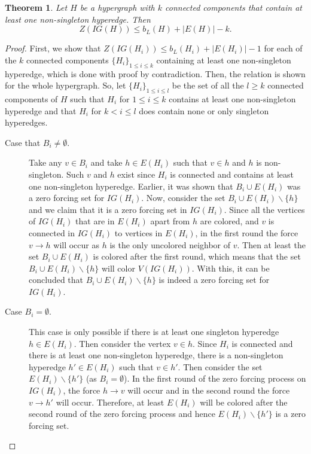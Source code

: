 \documentclass[12pt]{article}
\theoremstyle{plain}
\newtheorem{theorem}{Theorem}[section]
\theoremstyle{definition}
\theoremstyle{remark}
\begin{document}
\begin{theorem}
    Let $H$ be a hypergraph with $k$ connected components that contain at least one non-singleton hyperedge. Then
    \begin{equation}
        Z(IG(H)) \leq b_L(H) + |E(H)| - k.
        \label{eq:component hypergraph inequality}
    \end{equation}
    \label{thm:improved bound}
\end{theorem}
\begin{proof}
    First, we show that $Z(IG(H_i)) \leq b_L(H_i) + |E(H_i)| - 1$ for each of the $k$ connected components $\{H_i\}_{1\leq i\leq k}$ containing at least one non-singleton hyperedge, which is done with proof by contradiction. Then, the relation is shown for the whole hypergraph.
    So, let $\{H_i\}_{1\leq i\leq l}$ be the set of all the $l\geq k$ connected components of $H$ such that $H_i$ for $1\leq i \leq k$ contains at least one non-singleton hyperedge and that $H_i$ for $k< i\leq l$ does contain none or only singleton hyperedges. 

    
\begin{description}
    \item[Case that $B_i\neq \emptyset$.] Take any $v\in B_i$ and take $h\in E(H_i)$ such that $v\in h$ and $h$ is non-singleton. Such $v$ and $h$ exist since $H_i$ is connected and contains at least one non-singleton hyperedge. 
    Earlier, it was shown that $B_i\cup E(H_i)$ was a zero forcing set for $IG(H_i)$. 
    Now, consider the set $B_i\cup E(H_i) \backslash \{h\}$ and we claim that it is a zero forcing set in $IG(H_i)$. 
    Since all the vertices of $IG(H_i)$ that are in $E(H_i)$ apart from $h$ are colored, and $v$ is connected in $IG(H_i)$ to vertices in $E(H_i)$, in the first round the force $v\rightarrow h$ will occur as $h$ is the only uncolored neighbor of $v$. 
    Then at least the set $B_i\cup E(H_i)$ is colored after the first round, which means that the set $B_i\cup E(H_i) \backslash \{h\}$ will color $V(IG(H_i))$.
    With this, it can be concluded that $B_i\cup E(H_i) \backslash \{h\}$ is indeed a zero forcing set for $IG(H_i)$.
    \item[Case $B_i=\emptyset$.] This case is only possible if there is at least one singleton hyperedge $h\in E(H_i)$. Then consider the vertex $v\in h$. Since $H_i$ is connected and there is at least one non-singleton hyperedge, there is a non-singleton hyperedge $h'\in E(H_i)$ such that $v\in h'$. 
    Then consider the set $E(H_i)\backslash\{h'\}$ (as $B_i=\emptyset$). In the first round of the zero forcing process on $IG(H_i)$, the force $h\rightarrow v$ will occur and in the second round the force $v\rightarrow h'$ will occur.
    Therefore, at least $E(H_i)$ will be colored after the second round of the zero forcing process and hence $E(H_i)\backslash \{h'\}$ is a zero forcing set.
    

\end{description}
\end{proof}
\end{document}
